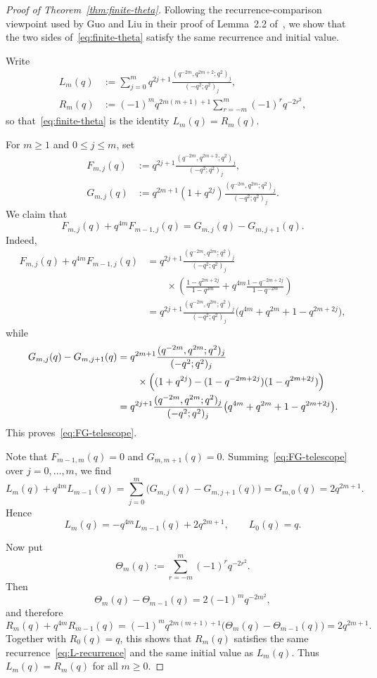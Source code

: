 \documentclass[reqno]{amsart}
\theoremstyle{definition}
\theoremstyle{plain}
\theoremstyle{remark}
\numberwithin{equation}{section}
\begin{document}
\begin{proof}[Proof of Theorem~\ref{thm:finite-theta}]
Following the recurrence-comparison viewpoint used by Guo and Liu in their proof of Lemma~2.2 of~\cite{guo-liu}, we show that the two sides of~\eqref{eq:finite-theta} satisfy the same recurrence and initial value.

Write
\begin{align*}
L_m(q)&:=\sum_{j=0}^{m} q^{2j+1}\frac{(q^{-2m},q^{2m+2};q^2)_j}{(-q^2;q^2)_j},\\
R_m(q)&:=(-1)^m q^{2m(m+1)+1}\sum_{r=-m}^{m}(-1)^r q^{-2r^2},
\end{align*}
so that~\eqref{eq:finite-theta} is the identity $L_m(q)=R_m(q)$.

For $m\ge 1$ and $0\le j\le m$, set
\begin{align*}
F_{m,j}(q)&:=q^{2j+1}\frac{(q^{-2m},q^{2m+2};q^2)_j}{(-q^2;q^2)_j},\\
G_{m,j}(q)&:=q^{2m+1}(1+q^{2j})\frac{(q^{-2m},q^{2m};q^2)_j}{(-q^2;q^2)_j}.
\end{align*}
We claim that
\begin{equation}\label{eq:FG-telescope}
F_{m,j}(q)+q^{4m}F_{m-1,j}(q)=G_{m,j}(q)-G_{m,j+1}(q).
\end{equation}
Indeed,
\begin{align*}
F_{m,j}(q)+q^{4m}F_{m-1,j}(q)
&=
q^{2j+1}\frac{(q^{-2m},q^{2m};q^2)_j}{(-q^2;q^2)_j}\\
&\qquad\times
\left(
\frac{1-q^{2m+2j}}{1-q^{2m}}
+
q^{4m}\frac{1-q^{-2m+2j}}{1-q^{-2m}}
\right)\\
&=
q^{2j+1}\frac{(q^{-2m},q^{2m};q^2)_j}{(-q^2;q^2)_j}
\bigl(q^{4m}+q^{2m}+1-q^{2m+2j}\bigr),
\end{align*}
while
\begin{align*}
G_{m,j}(q)-G_{m,j+1}(q)
&=
q^{2m+1}\frac{(q^{-2m},q^{2m};q^2)_j}{(-q^2;q^2)_j}\\
&\qquad\times\Bigl((1+q^{2j})-(1-q^{-2m+2j})(1-q^{2m+2j})\Bigr)\\
&=
q^{2j+1}\frac{(q^{-2m},q^{2m};q^2)_j}{(-q^2;q^2)_j}
\bigl(q^{4m}+q^{2m}+1-q^{2m+2j}\bigr).
\end{align*}
This proves~\eqref{eq:FG-telescope}.

Note that $F_{m-1,m}(q)=0$ and $G_{m,m+1}(q)=0$. Summing~\eqref{eq:FG-telescope} over $j=0,\dots,m$, we find
\[
L_m(q)+q^{4m}L_{m-1}(q)
=
\sum_{j=0}^{m}\bigl(G_{m,j}(q)-G_{m,j+1}(q)\bigr)
=
G_{m,0}(q)
=
2q^{2m+1}.
\]
Hence
\begin{equation}\label{eq:L-recurrence}
L_m(q)=-q^{4m}L_{m-1}(q)+2q^{2m+1},
\qquad L_0(q)=q.
\end{equation}

Now put
\[
\Theta_m(q):=\sum_{r=-m}^{m}(-1)^r q^{-2r^2}.
\]
Then
\[
\Theta_m(q)-\Theta_{m-1}(q)=2(-1)^m q^{-2m^2},
\]
and therefore
\[
R_m(q)+q^{4m}R_{m-1}(q)
=
(-1)^m q^{2m(m+1)+1}\bigl(\Theta_m(q)-\Theta_{m-1}(q)\bigr)
=
2q^{2m+1}.
\]
Together with $R_0(q)=q$, this shows that $R_m(q)$ satisfies the same recurrence~\eqref{eq:L-recurrence} and the same initial value as $L_m(q)$. Thus $L_m(q)=R_m(q)$ for all $m\ge 0$.
\end{proof}
\end{document}
